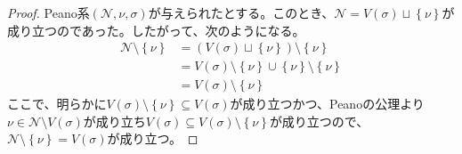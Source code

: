 \documentclass[dvipdfmx]{jsarticle}
\begin{document}
\begin{proof}
Peano系$\left( \mathcal{N,}\nu,\sigma \right)$が与えられたとする。このとき、$\mathcal{N} =V(\sigma) \sqcup \left\{ \nu \right\}$が成り立つのであった。したがって、次のようになる。
\begin{align*}
\mathcal{N \setminus}\left\{ \nu \right\} &= \left( V(\sigma) \sqcup \left\{ \nu \right\} \right) \setminus \left\{ \nu \right\}\\
&= V(\sigma) \setminus \left\{ \nu \right\} \cup \left\{ \nu \right\} \setminus \left\{ \nu \right\}\\
&= V(\sigma) \setminus \left\{ \nu \right\}
\end{align*}
ここで、明らかに$V(\sigma) \setminus \left\{ \nu \right\} \subseteq V(\sigma)$が成り立つかつ、Peanoの公理より$\nu \in \mathcal{N \setminus}V(\sigma)$が成り立ち$V(\sigma) \subseteq V(\sigma) \setminus \left\{ \nu \right\}$が成り立つので、$\mathcal{N \setminus}\left\{ \nu \right\} = V(\sigma)$が成り立つ。
\end{proof}
\end{document}
